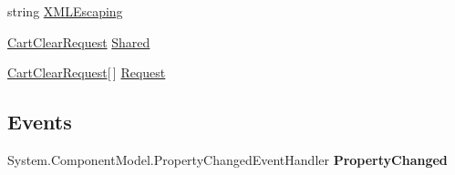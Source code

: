 \begin{DoxyCompactItemize}
\begin{DoxyCompactList}\small\item\em \end{DoxyCompactList}\item 
\hypertarget{class_price___comparison_1_1amazon_1_1ecs_1_1_cart_clear_a5ae1b2fc7618571b1bce11526439c38e}{string \hyperlink{class_price___comparison_1_1amazon_1_1ecs_1_1_cart_clear_a5ae1b2fc7618571b1bce11526439c38e}{X\-M\-L\-Escaping}}\label{class_price___comparison_1_1amazon_1_1ecs_1_1_cart_clear_a5ae1b2fc7618571b1bce11526439c38e}

\begin{DoxyCompactList}\small\item\em \end{DoxyCompactList}\item 
\hypertarget{class_price___comparison_1_1amazon_1_1ecs_1_1_cart_clear_ae40d61b638a17eb57846b0a74468b66c}{\hyperlink{class_price___comparison_1_1amazon_1_1ecs_1_1_cart_clear_request}{Cart\-Clear\-Request} \hyperlink{class_price___comparison_1_1amazon_1_1ecs_1_1_cart_clear_ae40d61b638a17eb57846b0a74468b66c}{Shared}}\label{class_price___comparison_1_1amazon_1_1ecs_1_1_cart_clear_ae40d61b638a17eb57846b0a74468b66c}

\begin{DoxyCompactList}\small\item\em \end{DoxyCompactList}\item 
\hypertarget{class_price___comparison_1_1amazon_1_1ecs_1_1_cart_clear_afb880ce954c1ae0a76b9ba8adc4a0e1a}{\hyperlink{class_price___comparison_1_1amazon_1_1ecs_1_1_cart_clear_request}{Cart\-Clear\-Request}\mbox{[}$\,$\mbox{]} \hyperlink{class_price___comparison_1_1amazon_1_1ecs_1_1_cart_clear_afb880ce954c1ae0a76b9ba8adc4a0e1a}{Request}}\label{class_price___comparison_1_1amazon_1_1ecs_1_1_cart_clear_afb880ce954c1ae0a76b9ba8adc4a0e1a}

\begin{DoxyCompactList}\small\item\em \end{DoxyCompactList}\end{DoxyCompactItemize}
\subsection*{Events}
\begin{DoxyCompactItemize}
\item 
\hypertarget{class_price___comparison_1_1amazon_1_1ecs_1_1_cart_clear_ae7af6b15b97f2a1ed815141fbca3d6eb}{System.\-Component\-Model.\-Property\-Changed\-Event\-Handler {\bfseries Property\-Changed}}\label{class_price___comparison_1_1amazon_1_1ecs_1_1_cart_clear_ae7af6b15b97f2a1ed815141fbca3d6eb}

\end{DoxyCompactItemize}
